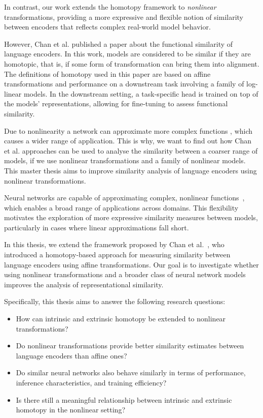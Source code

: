 In contrast, our work extends the homotopy framework to \emph{nonlinear} transformations, providing a more expressive and flexible notion of similarity between encoders that reflects complex real-world model behavior.

However, Chan et al. \cite{chan_affine_2024} published a paper about the functional similarity of language encoders.
In this work, models are considered to be similar if they are homotopic, that is, if some form of transformation can bring them into alignment.
The definitions of homotopy used in this paper are based on affine transformations and performance on a downstream task involving a family of log-linear models.
In the downstream setting, a task-specific head is trained on top of the models’ representations, allowing for fine-tuning to assess functional similarity.

Due to nonlinearity a network can approximate more complex functions \cite{antiga_deep_2020}, which causes a wider range of application. 
This is why, we want to find out how Chan et al. \cite{chan_affine_2024} approaches can be used to analyse the similarity between a coarser range of models, if we use nonlinear transformations and a family of nonlinear models.
This master thesis aims to improve similarity analysis of language encoders using nonlinear transformations. 

Neural networks are capable of approximating complex, nonlinear functions~\cite{antiga_deep_2020}, which enables a broad range of applications across domains.  
This flexibility motivates the exploration of more expressive similarity measures between models, particularly in cases where linear approximations fall short.

In this thesis, we extend the framework proposed by Chan et al.~\cite{chan_affine_2024}, who introduced a homotopy-based approach for measuring similarity between language encoders using affine transformations.  
Our goal is to investigate whether using nonlinear transformations and a broader class of neural network models improves the analysis of representational similarity.

Specifically, this thesis aims to answer the following research questions:
\begin{itemize}
    \item How can intrinsic and extrinsic homotopy be extended to nonlinear transformations?
    \item Do nonlinear transformations provide better similarity estimates between language encoders than affine ones?
    \item Do similar neural networks also behave similarly in terms of performance, inference characteristics, and training efficiency?
    \item Is there still a meaningful relationship between intrinsic and extrinsic homotopy in the nonlinear setting?
\end{itemize}



